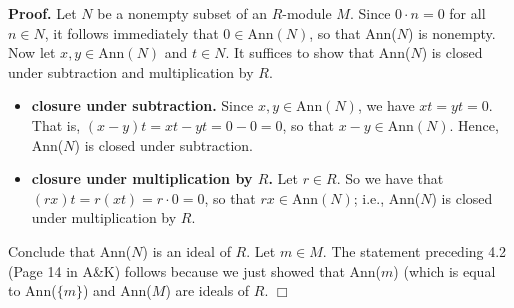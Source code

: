 \documentclass[9pt]{article}
\newcommand{\qed}{\hfill \ensuremath{\Box}}
\begin{document}
\begin{enumerate}
      \textbf{Proof.} Let $N$ be a nonempty subset of an $R$-module $M$. Since
      $0 \cdot n = 0$ for all $n \in N$, it follows immediately that
      $0 \in \text{Ann}(N)$, so that Ann($N$) is nonempty. Now let
      $x, y \in \text{Ann}(N)$ and $t \in N$. It suffices to show that Ann($N$)
      is closed under subtraction and multiplication by $R$. 
      \begin{itemize}
         \item \textbf{closure under subtraction.} Since
               $x, y \in \text{Ann}(N)$, we have $xt = yt = 0$. That is,
               $(x - y)t = xt - yt = 0 - 0 = 0$, so that
               $x - y \in \text{Ann}(N)$. Hence, Ann($N$) is closed under
               subtraction.
         \item \textbf{closure under multiplication by $R$.} Let $r \in R$. So
               we have that $(rx)t = r(xt) = r\cdot 0 = 0$, so that
               $rx \in \text{Ann}(N)$; i.e., Ann($N$) is closed under
               multiplication by $R$.
      \end{itemize}
      Conclude that Ann($N$) is an ideal of $R$. Let $m \in M$. The statement
      preceding 4.2 (Page 14 in A\&K) follows because we just showed that
      Ann($m$) (which is equal to Ann($\{m\}$) and Ann($M$) are ideals of $R$.
      \qed
\end{enumerate}
\end{document}
